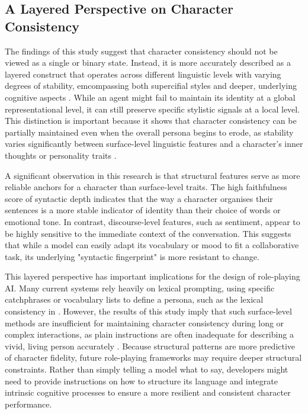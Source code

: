 \documentclass{article}
\begin{document}
\subsection{A Layered Perspective on Character Consistency}

The findings of this study suggest that character consistency should not be viewed as a single or binary state. Instead, it is more accurately described as a layered construct that operates across different linguistic levels with varying degrees of stability, emcompassing both supercifial styles and deeper, underlying cognitive aspects \citep{chen2024review, chen2024evaluating}. While an agent might fail to maintain its identity at a global representational level, it can still preserve specific stylistic signals at a local level. This distinction is important because it shows that character consistency can be partially maintained even when the overall persona begins to erode, as stability varies significantly between surface-level linguistic features and a character's inner thoughts or personality traits \citep{chen2024review}. 

A significant observation in this research is that structural features serve as more reliable anchors for a character than surface-level traits. The high faithfulness score of syntactic depth indicates that the way a character organises their sentences is a more stable indicator of identity than their choice of words or emotional tone. In contrast, discourse-level features, such as sentiment, appear to be highly sensitive to the immediate context of the conversation. This suggests that while a model can easily adapt its vocabulary or mood to fit a collaborative task, its underlying "syntactic fingerprint" is more resistant to change.

This layered perspective has important implications for the design of role-playing AI. Many current systems rely heavily on lexical prompting, using specific catchphrases or vocabulary lists to define a persona, such as the lexical consistency in \cite{wang2024rolellm}. However, the results of this study imply that such surface-level methods are insufficient for maintaining character consistency during long or complex interactions, as plain instructions are often inadequate for describing a vivid, living person accurately \citep{shao2023characterllm}. Because structural patterns are more predictive of character fidelity, future role-playing frameworks may require deeper structural constraints. Rather than simply telling a model what to say, developers might need to provide instructions on how to structure its language and integrate intrinsic cognitive processes \citep{zhou2023characterglm} to ensure a more resilient and consistent character performance.
\end{document}
